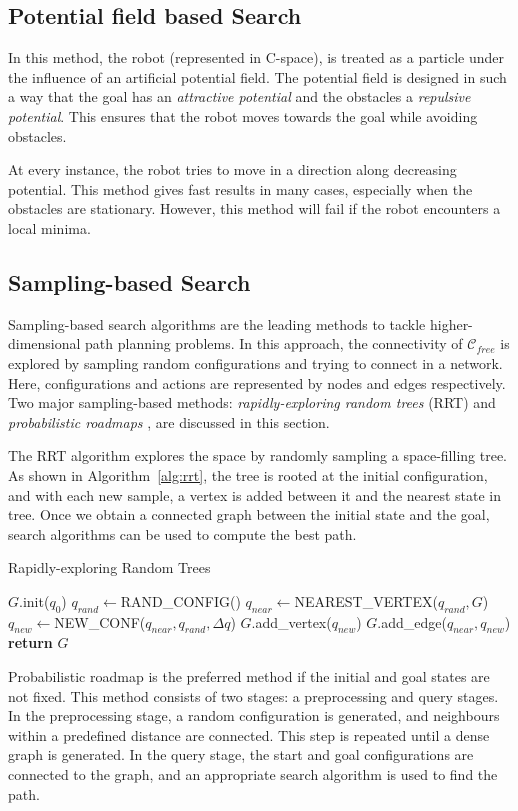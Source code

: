 \subsection{Potential field based Search}
\label{sec:pot_search}
In this method, the robot (represented in C-space), is treated as a particle under the influence of an artificial potential field. The potential field is designed in such a way that the goal has an \textit{attractive potential} and the obstacles a \textit{repulsive potential}. This ensures that the robot moves towards the goal while avoiding obstacles. 

At every instance, the robot tries to move in a direction along decreasing potential. This method gives fast results in many cases, especially when the obstacles are stationary. However, this method will fail if the robot encounters a local minima.
\subsection{Sampling-based Search}
\label{sec:sampling_search}
Sampling-based search algorithms are the leading methods to tackle higher-dimensional path planning problems. In this approach, the connectivity of $\mathcal{C}_{free}$ is explored by sampling random configurations and trying to connect in a network. Here, configurations and actions are represented by nodes and edges respectively. Two major sampling-based methods: \textit{rapidly-exploring random trees} (RRT) \cite{lavalle2006planning} and \textit{probabilistic roadmaps} \cite{kavraki1994probabilistic}, are discussed in this section.

The RRT algorithm explores the space by randomly sampling a space-filling tree. As shown in Algorithm~\ref{alg:rrt}, the tree is rooted at the initial configuration, and with each new sample, a vertex is added between it and the nearest state in tree. Once we obtain a connected graph between the initial state and the goal, search algorithms can be used to compute the best path. 

\begin{algorithm}
\caption{Rapidly-exploring Random Trees}\label{alg:rrt}
\begin{algorithmic}[1]
\State $G$.init($q_0$)
\State $q_{rand}\gets$RAND\_CONFIG()
\State $q_{near}\gets$NEAREST\_VERTEX($q_{rand},G$)
\State $q_{new}\gets$NEW\_CONF($q_{near}, q_{rand}, \Delta q$)
\State $G$.add\_vertex($q_{new}$)
\State $G$.add\_edge($q_{near},q_{new}$)
\EndFor
\State \textbf{return} $G$

\end{algorithmic}
\end{algorithm}
Probabilistic roadmap is the preferred method if the initial and goal states are not fixed. This method consists of two stages: a preprocessing and query stages. In the preprocessing stage, a random configuration is generated, and neighbours within a predefined distance are connected. This step is repeated until a dense graph is generated. In the query stage, the start and goal configurations are connected to the graph, and an appropriate search algorithm is used to find the path. 

